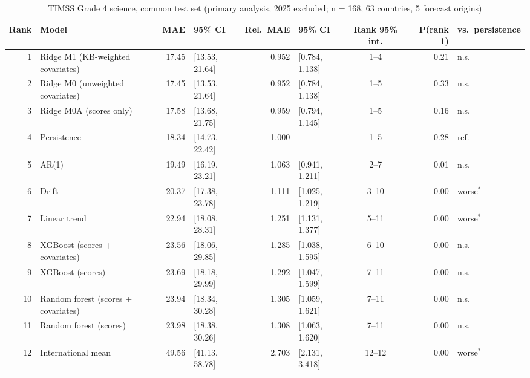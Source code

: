 \begin{table}[htbp]
\centering
\footnotesize
\caption{TIMSS Grade 4 science, common test set (primary analysis, 2025 excluded; n = 168, 63 countries, 5 forecast origins)}
\label{tab:A8}
\begin{tabular}{rlrlrlcrl}
\toprule
Rank & Model & MAE & 95\% CI & Rel.\ MAE & 95\% CI & Rank 95\% int. & P(rank 1) & vs.\ persistence \\
\midrule
1 & Ridge M1 (KB-weighted covariates) & 17.45 & [13.53, 21.64] & 0.952 & [0.784, 1.138] & 1--4 & 0.21 & n.s. \\
2 & Ridge M0 (unweighted covariates) & 17.45 & [13.53, 21.64] & 0.952 & [0.784, 1.138] & 1--5 & 0.33 & n.s. \\
3 & Ridge M0A (scores only) & 17.58 & [13.68, 21.75] & 0.959 & [0.794, 1.145] & 1--5 & 0.16 & n.s. \\
4 & Persistence & 18.34 & [14.73, 22.42] & 1.000 & -- & 1--5 & 0.28 & ref. \\
5 & AR(1) & 19.49 & [16.19, 23.21] & 1.063 & [0.941, 1.211] & 2--7 & 0.01 & n.s. \\
6 & Drift & 20.37 & [17.38, 23.78] & 1.111 & [1.025, 1.219] & 3--10 & 0.00 & worse$^{*}$ \\
7 & Linear trend & 22.94 & [18.08, 28.31] & 1.251 & [1.131, 1.377] & 5--11 & 0.00 & worse$^{*}$ \\
8 & XGBoost (scores + covariates) & 23.56 & [18.06, 29.85] & 1.285 & [1.038, 1.595] & 6--10 & 0.00 & n.s. \\
9 & XGBoost (scores) & 23.69 & [18.18, 29.99] & 1.292 & [1.047, 1.599] & 7--11 & 0.00 & n.s. \\
10 & Random forest (scores + covariates) & 23.94 & [18.34, 30.28] & 1.305 & [1.059, 1.621] & 7--11 & 0.00 & n.s. \\
11 & Random forest (scores) & 23.98 & [18.38, 30.26] & 1.308 & [1.063, 1.620] & 7--11 & 0.00 & n.s. \\
12 & International mean & 49.56 & [41.13, 58.78] & 2.703 & [2.131, 3.418] & 12--12 & 0.00 & worse$^{*}$ \\
\bottomrule
\end{tabular}
\par{}
\end{table}
